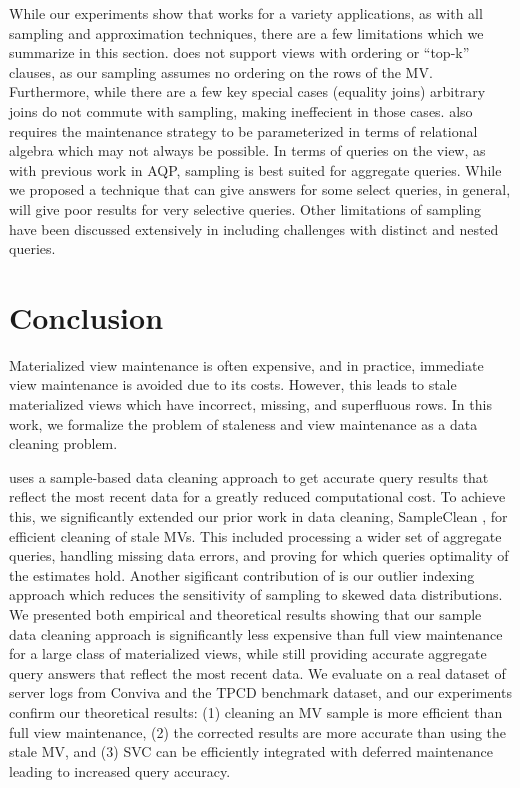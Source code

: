 While our experiments show that \svc works for a variety applications, as with all sampling and approximation techniques, there are a few limitations which we summarize in this section.
\svc does not support views with ordering or ``top-k'' clauses, as our sampling assumes no ordering on the rows of the MV.
Furthermore, while there are a few key special cases (equality joins) arbitrary joins do not commute with sampling, making \svc ineffecient in those cases.
\svc also requires the maintenance strategy to be parameterized in terms of relational algebra which may not always be possible.
In terms of queries on the view, as with previous work in AQP, sampling is best suited for aggregate queries.
While we proposed a technique that can give answers for some select queries, in general, \svc will give poor results for very selective queries.
Other limitations of sampling have been discussed extensively in \cite{DBLP:journals/ftdb/CormodeGHJ12} including challenges with distinct and nested queries.

\vspace{-1em}
\section{Conclusion}\label{conclusion}
\vspace{-.3em}
Materialized view maintenance is often expensive, and in practice, immediate view maintenance is avoided due to its costs.
However, this leads to stale materialized views which have incorrect, missing, and superfluous rows.
In this work, we formalize the problem of staleness and view maintenance as a data cleaning problem.

\svc uses a sample-based data cleaning approach to get accurate query results that reflect the most recent data for a greatly reduced computational cost.
To achieve this, we significantly extended our prior work in data cleaning, SampleClean \cite{wang1999sample}, for efficient cleaning of stale MVs. 
This included processing a wider set of aggregate queries, handling missing data errors, and proving for which queries optimality of the estimates hold.
Another sigificant contribution of \svc is our outlier indexing approach which reduces the sensitivity of sampling to skewed data distributions.
We presented both empirical and theoretical results showing that our sample data cleaning approach is significantly less expensive than full view maintenance for a large class of materialized views, while still providing accurate aggregate query answers that reflect the most recent data.
We evaluate \svc on a real dataset of server logs from Conviva and the TPCD benchmark dataset, and our experiments confirm our theoretical results: (1) cleaning an MV sample is more efficient than full view maintenance, (2) the corrected results are more accurate than using the stale MV, and (3) SVC can be efficiently integrated with deferred maintenance leading to increased query accuracy. 





